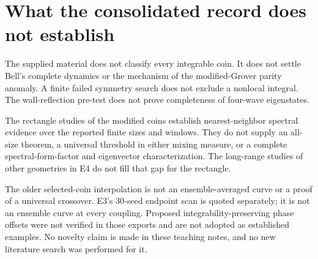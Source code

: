 \documentclass[11pt,a4paper,oneside]{report}
\numberwithin{equation}{chapter}
\begin{document}
\section{What the consolidated record does not establish}

The supplied material does not classify every integrable coin. It
does not settle Bell's complete dynamics or the mechanism of the
modified-Grover parity anomaly. A finite failed symmetry search does
not exclude a nonlocal integral. The wall-reflection pre-test does
not prove completeness of four-wave eigenstates.

The rectangle studies of the modified coins establish
nearest-neighbor spectral evidence over the reported finite sizes and
windows. They do not supply an all-size theorem, a universal threshold
in either mixing measure, or a complete spectral-form-factor and
eigenvector characterization. The long-range studies of other
geometries in E4 do not fill that gap for the rectangle.

The older selected-coin interpolation is not an ensemble-averaged curve
or a proof of a universal crossover. E3's 30-seed endpoint scan is quoted
separately; it is not an ensemble curve at every coupling. Proposed integrability-preserving
phase offsets were not verified in those exports and are not adopted
as established examples. No novelty claim is made in these teaching
notes, and no new literature search was performed for it.
\end{document}
